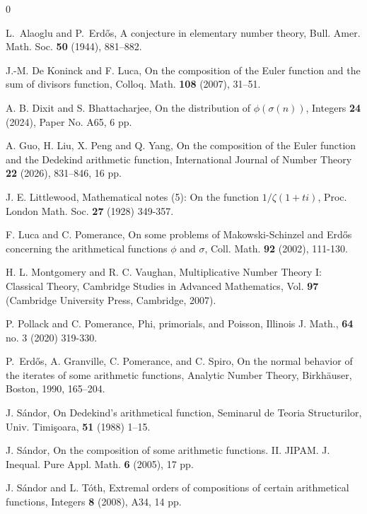 \documentclass{article}
\theoremstyle{remark}
\begin{document}
\bigskip
\begin{thebibliography}{0}

  L.~Alaoglu and P.~Erd\H{o}s, 
A conjecture in elementary number theory, 
Bull. Amer. Math. Soc. \textbf{50} (1944), 881--882.

J.-M. De Koninck and F. Luca, On the composition of the Euler function and the sum of divisors function, Colloq. Math. \textbf{108} (2007),  31–51.

 A. B. Dixit and S. Bhattacharjee, On the distribution of $\phi(\sigma(n))$, Integers \textbf{24} (2024), Paper No. A65, 6 pp.

A. Guo, H. Liu, X. Peng and Q. Yang, On the composition of the Euler function and the Dedekind arithmetic function, International Journal of Number Theory \textbf{22} (2026), 831–846, 16 pp.

 J. E. Littlewood, Mathematical notes (5): On the function $1/\zeta (1 + ti)$, Proc. London Math. Soc. \textbf{27} (1928) 349-357.

 F. Luca and C. Pomerance, On some problems of Makowski-Schinzel and Erd\H{o}s concerning the arithmetical functions $\phi$ and $\sigma$, Coll. Math.
\textbf{92} (2002), 111-130.

 H. L. Montgomery and R. C. Vaughan, Multiplicative Number Theory I: Classical
Theory, Cambridge Studies in Advanced Mathematics, Vol. \textbf{97} (Cambridge University
Press, Cambridge, 2007).

 P. Pollack and C. Pomerance, Phi, primorials, and Poisson, Illinois J. Math., \textbf{64} no. 3 (2020) 319-330.

P.~Erd\H{o}s, A. Granville, C. Pomerance, and C. Spiro, On the normal
behavior of the iterates of some arithmetic functions, Analytic Number
Theory, Birkh\"auser, Boston, 1990, 165–204.

 J. Sándor, On Dedekind’s arithmetical function, Seminarul de Teoria Structurilor, Univ. Timi\c{s}oara,  \textbf{51} (1988) 1–15. 

 J. Sándor, On the composition of some arithmetic functions. II. JIPAM. J. Inequal. Pure Appl. Math. \textbf{6} (2005), 17 pp.

 J. Sándor and L. Tóth,  Extremal orders of compositions of certain arithmetical functions, Integers \textbf{8} (2008),  A34, 14 pp.

\end{thebibliography}
\end{document}

